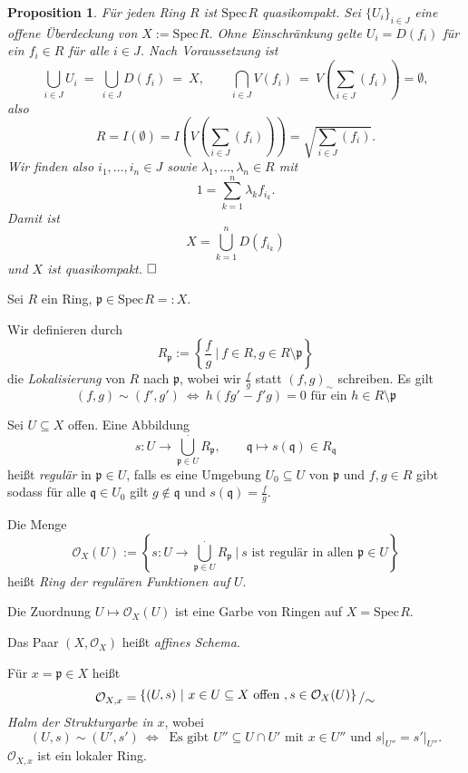 \documentclass[11pt]{book}
\newtheorem{proposition}[theorem]{Proposition}
\theoremstyle{nonumberbreak}
\newenvironment{pr}[1][]{\ifthenelse{\equal{#1}{}}{\proof}{\proof[#1]}\rm}{\endproof}
\newenvironment{erinndefin}[1][]{\ifthenelse{\equal{#1}{}}{\erinndefini}{\erinndefini[#1]}\rm}{\enderinndefini}
\newcommand{\spec}{\mathrm{Spec} \hspace{1pt} }
\newcommand{\p}{\mathfrak{p}}
\newcommand{\q}{\mathfrak{q}}
\newcommand{\bigslant}[2]{{\raisebox{.2em}{$#1$}\left/\raisebox{-.2em}{$#2$}\right.}}
\begin{document}
\begin{spacing}{1.4}
\begin{proposition}    %
Für jeden Ring $R$ ist $\spec R$ quasikompakt.
\begin{pr}
Sei $\{U_i\}_{i \in J}$ eine offene Überdeckung von $X:= \spec R$. Ohne Einschränkung gelte $U_i = D(f_i)$ für ein $f_i \in R$ für alle $i \in J$. Nach Voraussetzung ist 
$$\bigcup_{i \in J} U_i \ = \ \bigcup_{i \in J} D(f_i) \ = \ X, \qquad \bigcap_{i \in J} V(f_i) \ = \ V \left( \sum_{i \in J} ( f_i ) \right) = \emptyset,$$
also 
$$R = I(\emptyset) = I \left( V \left( \sum_{i \in J } ( f_i ) \right) \right) = \sqrt{ \sum_{i \in J} ( f_i )}.$$
Wir finden also $i_1, \ldots, i_n \in J$ sowie $\lambda_1, \ldots, \lambda_n \in R$ mit 
$$1 = \sum_{k=1}^n \lambda_k f_{i_k}.$$
Damit ist 
$$X= \bigcup_{k=1}^n D\left(f_{i_k}\right)$$
und $X$ ist quasikompakt. $\hfill \Box$


\end{pr}
\end{proposition}

\newcommand{\bigcupdot}{\overset{\bf{.}}{\bigcup}}

\begin{erinndefin}    %
Sei $R$ ein Ring, $\p \in \spec R=:X$. 
\begin{compactenum}
\item Wir definieren durch 
$$R_{\p} := \left\{ \frac{f}{g} \ \bigg \vert \ f \in R, g \in R \setminus \p \right\}$$
die \textit{Lokalisierung} von $R$ nach $\p$, wobei wir $\frac{f}{g}$ statt $(f,g)_{\sim}$ schreiben. Es gilt
$$(f,g) \sim (f', g')\ \Longleftrightarrow \ h\left(fg'-f'g\right) = 0 \textrm{ für ein } h \in R\setminus \p$$
\item Sei $U \subseteq X$ offen. Eine Abbildung 
$$s: U \longrightarrow \bigcup_{ \p \in U}^{.} R_{\p}, \qquad \q \mapsto s(\q) \in R_{\q}$$
heißt \textit{regulär} in $\p \in U$, falls es eine Umgebung $U_0 \subseteq U$ von $\p$ und $f,g \in R$ gibt sodass für alle $\q \in U_0$ gilt $g \notin \q$ und $s(\q) = \frac{f}{g}.$
\item Die Menge
$$\mathcal{O}_X(U) := \left \{ s: U \longrightarrow \bigcup_{\p \in U}^{.} R_{\p} \ \bigg\vert \ s \textrm{ ist regulär in allen }\p \in U \right\}$$
heißt \textit{Ring der regulären Funktionen auf }$U$.
\item Die Zuordnung $U \mapsto \mathcal{O}_X(U)$ ist eine Garbe von Ringen auf $X=\spec R$.
\item Das Paar $(X, \mathcal{O}_X)$ heißt \textit{affines Schema}.
\item Für $x=\p \in X$ heißt
$$\mathcal{O}_{X,x} = \bigslant{\{ (U,s) \ \vert \ x \in U\subseteq X \textrm{ offen }, s \in \mathcal{O}_{X}(U) \} }{\sim}$$
\textit{Halm der Strukturgarbe in }$x$, wobei 
$$(U,s) \sim (U',s') \ \Longleftrightarrow \ \textrm{ Es gibt } U'' \subseteq U \cap U' \textrm{ mit } x \in U'' \textrm{ und } s \vert_{U''}= s'\vert_{U''}.$$
$\mathcal{O}_{X,x}$ ist ein lokaler Ring.
\end{compactenum}
\end{erinndefin}


\end{spacing}
\end{document}
